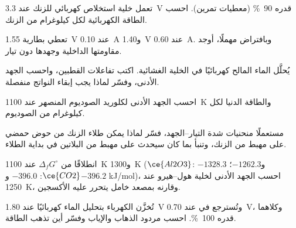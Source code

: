 \begin{exercise}[$\star\star$]\label{exo:b2:batteries-electrolysis:6}
تعمل خلية استخلاص كهربائي للزنك عند \qty{3.3}{V}  قدره
90~\% (معطيات تمرين). احسب الطاقة الكهربائية لكل كيلوغرام من الزنك.
\end{exercise}

\begin{exercise}[$\star\star$]\label{exo:b2:batteries-electrolysis:7}
تعطي بطارية \qty{1.55}{V} عند \qty{0.10}{A} و\qty{1.40}{V} عند \qty{0.60}{A}.
وبافتراض  مهملًا، أوجد مقاومتها الداخلية وجهدها
دون تيار.
\end{exercise}

\begin{exercise}[$\star\star$]\label{exo:b2:batteries-electrolysis:8}
يُحلَّل الماء المالح كهربائيًا في الخلية الغشائية. اكتب تفاعلات القطبين،
واحسب الجهد الأدنى، وفسّر لماذا يجب إبقاء النواتج
منفصلة.
\end{exercise}

\begin{exercise}[$\star\star$]\label{exo:b2:batteries-electrolysis:9}
احسب الجهد الأدنى  لكلوريد الصوديوم المنصهر عند
\qty{1100}{K} والطاقة الدنيا لكل كيلوغرام من الصوديوم.
\end{exercise}

\begin{exercise}[$\star\star\star$]\label{exo:b2:batteries-electrolysis:10}
مستعملًا منحنيات شدة التيار--الجهد، فسّر لماذا يمكن طلاء الزنك من حوض
حمضي على مهبط من الزنك، وتنبأ بما كان سيحدث على مهبط من البلاتين في
بداية الطلاء.
\end{exercise}

\begin{exercise}[$\star\star\star$]\label{exo:b2:batteries-electrolysis:11}
انطلاقًا من $\Delta_f G^\circ$ عند \qty{1100}{K} و\qty{1300}{K} ($\ce{Al2O3}$: $-1328.3$ 
و$-1262.3$؛ $\ce{CO2}$: $-396.0$ و$-396.2$ \unit{kJ/mol})، احسب الجهد
الأدنى لخلية هول--هيرو عند \qty{1250}{K}، وقارنه بمصعد خامل
يتحرر عليه الأكسجين.
\end{exercise}

\begin{exercise}[$\star\star\star$]\label{exo:b2:batteries-electrolysis:12}
تُخزَّن الكهرباء بتحليل الماء كهربائيًا عند \qty{1.80}{V} وتُسترجع في  عند \qty{0.70}{V}، وكلاهما  قدره 100~\%. احسب
مردود الذهاب والإياب وفسّر أين تذهب الطاقة.
\end{exercise}

